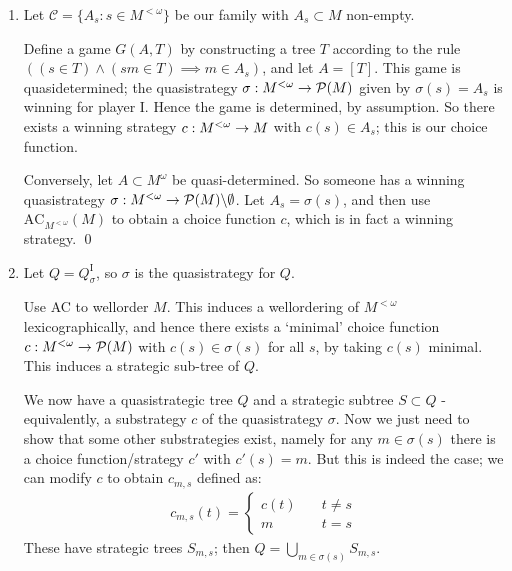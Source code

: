 \documentclass[]{article}
\newcommand{\I}{\textrm{I}}
\newcommand{\om}{\omega}
\newcommand{\lom}{{<\omega}}
\renewcommand{\ac}{\textrm{AC}}
\begin{document}
\begin{enumerate}[label = (\arabic*)]
    \begin{itemize}
        \item on the first move, player I can play anything
        \item given $m \in T$, the possible moves for player II are $\{s:s\in A_m\}$.
    \end{itemize}
    So, explcitily, $T = \{\emptyset\}\cup\{m:m\in M\}\cup\{ms:m\in M,s\in A_m\}$.

    The payoff set $A$ is simply $\emptyset$, \it{i.e.} player II always wins. By assumption, this game $G(A,T)$ is determined, so someone has a winning strategy; clearly this must be player II.

    So II has a winning strategy $\tau$, which in turn naturally induces a choice function $c$ for $\mathcal{C}$ given by $c(m) = \tau(\langle m\rangle)$. \qed

    \item Let $\mathcal{C} = \{A_s:s \in M^\lom\}$ be our family with $A_s\subset M$ non-empty.
    
    Define a game $G(A,T)$ by constructing a tree $T$ according to the rule $((s\in T)\land (sm \in T)\implies m \in A_s)$, and let $A = [T]$. This game is quasidetermined; the quasistrategy $\sigma : M^\lom \ra \mathcal{P}(M)$ given by $\sigma(s) = A_s$ is winning for player I. Hence the game is determined, by assumption. So there exists a winning strategy $c : M^\lom \ra M$ with $c(s) \in A_s$; this is our choice function.
    
    Conversely, let $A\subset M^\om$ be quasi-determined. So someone has a winning quasistrategy $\sigma : M^\lom \ra \mathcal{P}(M)\backslash \emptyset$. Let $A_s = \sigma(s)$, and then use $\ac_{M^\lom}(M)$ to obtain a choice function $c$, which is in fact a winning strategy. \qed

    \item Let $Q = Q_\sigma^\I$, so $\sigma$ is the quasistrategy for $Q$.
    
    Use AC to wellorder $M$. This induces a wellordering of $M^\lom$ lexicographically, and hence there exists a `minimal' choice function $c : M^\lom \ra \mathcal{P}(M)$ with $c(s) \in \sigma(s)$ for all $s$, by taking $c(s)$ minimal. This induces a strategic sub-tree of $Q$.

    We now have a quasistrategic tree $Q$ and a strategic subtree $S\subset Q$ - equivalently, a substrategy $c$ of the quasistrategy $\sigma$. Now we just need to show that some other substrategies exist, namely for any $m \in \sigma(s)$ there is a choice function/strategy $c'$ with $c'(s) = m$. But this is indeed the case; we can modify $c$ to obtain $c_{m,s}$ defined as:
    \begin{align*}
        c_{m,s}(t) = \left\lbrace \begin{array}{cc} c(t)\quad&t\ne s \\ m\quad & t = s \end{array} \right.
    \end{align*}
    These have strategic trees $S_{m,s}$; then $Q = \bigcup_{m\in \sigma(s)}S_{m,s}$.


\end{enumerate}
\end{document}
